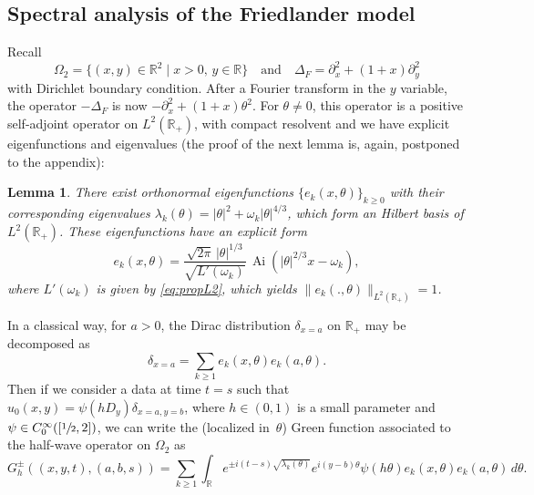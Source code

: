 \documentclass[JEP,XML,SOM,Unicode,NoEqCountersInSection,NoFloatCountersInSection,published]{cedram}
\newcommand{\quand}{\quad\text{and}\quad}
\DeclareMathOperator{\Ai}{Ai}
\theoremstyle{plain}
\newtheorem{lemma}{Lemma}
\theoremstyle{definition}
\begin{document}
\subsection{Spectral analysis of the Friedlander model}

Recall
\[
\Omega_2=\{(x,y)\in\mathbb{R}^2\mid x>0,\,y\in\mathbb{R}\}\quand
\Delta_F=\partial^{2}_{x}+(1+x)\partial^{2}_{y}
\]
with Dirichlet boundary condition. After a Fourier transform in the $y$ variable, the operator $-\Delta_{F}$ is now
$-\partial^2_x+(1+x)\theta^2$. For $\theta\neq 0$, this operator is a positive self-adjoint operator
on $L^2(\mathbb{R}_+)$, with compact resolvent and we have explicit eigenfunctions and eigenvalues (the proof of the next lemma is, again, postponed to the appendix):

\begin{lemma}\label{lemorthog}
There exist orthonormal eigenfunctions $\{e_k(x,\theta)\}_{k\geq 0}$ with their corresponding eigenvalues $\lambda_k(\theta)=|\theta|^2+\omega_k|\theta|^{4/3}$, which form an Hilbert basis of $L^{2}(\mathbb{R}_{+})$. These eigenfunctions have an explicit form
\begin{equation}\label{eig_k}
e_k(x,\theta)=\frac{\sqrt{2\pi}\,|\theta|^{1/3}}{\sqrt{L'(\omega_k)}}\,
\Ai(|\theta|^{2/3}x-\omega_k),
\end{equation}
where $L'(\omega_k)$ is given by \eqref{eq:propL2}, which yields
$\|e_k(.,\theta)\|_{L^2(\mathbb{R}_+)}=1$.
\end{lemma}

In a classical way, for $a>0$, the Dirac distribution $\delta_{x=a}$ on $\mathbb{R}_+$ may be decomposed as
\[
\delta_{x=a}=\sum_{k\geq 1} e_k(x,\theta)e_k(a,\theta).
\]
Then if we consider a data at time $t=s$ such that
$u_0(x,y)=\psi(hD_y)\delta_{x=a,y=b}$, where $h\in (0,1)$ is a small parameter and
$\psi\in C^{\infty}_0([\sfrac 12,2])$, we can write the (localized in~$\theta$) Green function associated to the half-wave operator on $\Omega_{2}$ as
\begin{equation}
\label{greenfct} G^{\pm}_{h}((x,y,t),(a,b,s))=\sum_{k\geq 1}
\int_{\mathbb{R}}e^{\pm i(t-s)\sqrt{\lambda_k(\theta)}}
e^{i(y-b)\theta}
\psi(h\theta)e_k(x,\theta)e_k(a,\theta)\,d\theta.
\end{equation}
\end{document}
